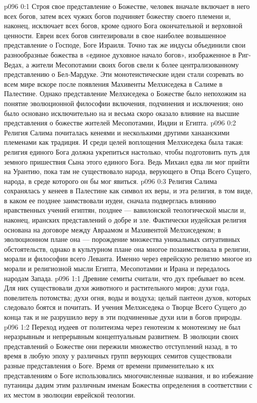 \author{Мелхиседек}
\vs p096 0:1 Строя свое представление о Божестве, человек вначале включает в него всех богов, затем всех чужих богов подчиняет божеству своего племени и, наконец, исключает всех богов, кроме одного Бога окончательной и верховной ценности. Евреи всех богов синтезировали в свое наиболее возвышенное представление о Господе, Боге Израиля. Точно так же индусы объединили свои разнообразные божества в «единое духовное начало богов», изображенное в Риг\hyp{}Ведах, а жители Месопотамии своих богов свели к более централизованному представлению о Бел\hyp{}Мардуке. Эти монотеистические идеи стали созревать во всем мире вскоре после появления Махивенты Мелхиседека в Салиме в Палестине. Однако представление Мелхиседека о Божестве было непохожим на понятие эволюционной философии включения, подчинения и исключения; оно было основано исключительно на  и весьма скоро оказало влияние на высшие представления о божестве жителей Месопотамии, Индии и Египта.
\vs p096 0:2 \pc Религия Салима почиталась кенеями и несколькими другими ханаанскими племенами как традиция. И среди целей воплощения Мелхиседека была такая: религия единого Бога должна укрепиться настолько, чтобы подготовить путь для земного пришествия Сына этого единого Бога. Ведь Михаил едва ли мог прийти на Урантию, пока там не существовало народа, верующего в Отца Всего Сущего, народа, в среде которого он бы мог явиться.
\vs p096 0:3 Религия Салима сохранялась у кенеев в Палестине как символ их веры, и эта религия, в том виде, в каком ее позднее заимствовали иудеи, сначала подверглась влиянию нравственных учений египтян, позднее --- вавилонской теологической мысли и, наконец, иранских представлений о добре и зле. Фактически иудейская религия основана на договоре между Авраамом и Махивентой Мелхиседеком; в эволюционном плане она --- порождение множества уникальных ситуативных обстоятельств, однако в культурном плане она многое позаимствовала в религии, морали и философии всего Леванта. Именно через еврейскую религию многое из морали и религиозной мысли Египта, Месопотамии и Ирана и передалось народам Запада.
\vs p096 1:1 Древние семиты считали, что дух пребывает во всем. Для них существовали духи животного и растительного миров; духи года, повелитель потомства; духи огня, воды и воздуха; целый пантеон духов, которых следовало боятся и почитать. И учения Мелхиседека о Творце Всего Сущего до конца так и не разрушило веру в эти подчиненные духи или в богов природы.
\vs p096 1:2 Переход иудеев от политеизма через генотеизм к монотеизму не был неразрывным и непрерывным концептуальным развитием. В эволюции своих представлений о Божестве они пережили множество отступлений назад, в то время в любую эпоху у различных групп верующих семитов существовали разные представления о Боге. Время от времени применительно к их представлениям о Боге использовались многочисленные названия, и во избежание путаницы дадим этим различным именам Божества определения в соответствии с их местом в эволюции еврейской теологии.
